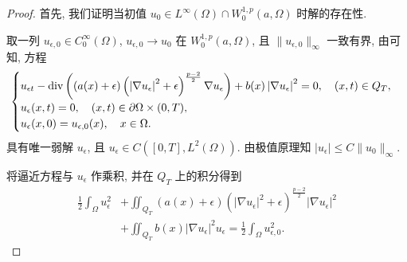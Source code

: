 \documentclass[oneside,longtitle]{LZUthesis}
\numberwithin{equation}{chapter}
\newcommand*\abs[1]{\lvert#1\rvert}
\newcommand*\norm[1]{\lVert#1\rVert}
\DeclareMathOperator{\Div}{div}
\begin{document}
\begin{proof}
	首先, 我们证明当初值 $u_0 \in L^{\infty}(\Omega) \cap W_0^{1, p}(a, \Omega)$ 时解的存在性.

	取一列 $u_{\epsilon,0} \in C_0^\infty(\Omega) $, $u_{\epsilon,0} \to u_0 $ 在 $W_0^{1,p}(a, \Omega) $,
	且 $\norm{u_{\epsilon, 0}}_{\infty}$ 一致有界,
	由\citep{taylorPartialDifferentialEquations2011}可知, 方程
	\begin{equation}\label{eq:approximated_maineq}
		\begin{cases}
			u_{\epsilon t}-\Div\left((a(x)+\epsilon)
			\left(\left|\nabla u_{\epsilon}\right|^{2}+\epsilon\right)^{\frac{p-2}{2}} \nabla u_{\epsilon}\right)
			+b(x)\left|\nabla u_{\epsilon}\right|^{2} = 0, \quad (x, t) \in Q_{T}, \\
			u_{\epsilon}(x, t)  = 0, \quad (x, t) \in \partial \Omega \times(0, T), \notag \\
			u_{\epsilon}(x, 0)  = u_{\epsilon, 0}(x), \quad x \in \Omega. \notag
		\end{cases}
	\end{equation}
	具有唯一弱解 $u_\epsilon$, 且 $u_\epsilon \in C([0, T], L^2(\Omega))$.
	由极值原理知 $\abs{u_{\epsilon}} \leq C\norm{u_0}_{\infty}$.

	将逼近方程与 $u_\epsilon$ 作乘积, 并在 $Q_T$ 上的积分得到
	\begin{equation}\label{eq:1}
		\begin{split}
			\frac{1}{2} \int_{\Omega} u_{\epsilon}^{2}
			&+\iint_{Q_{T}}(a(x)+\epsilon)\left(\left|\nabla u_{\epsilon}\right|^{2}+\epsilon\right)^{\frac{p-2}{2}}\left|\nabla u_{\epsilon}\right|^{2}\\
			&+\iint_{Q_{T}} b(x)\left|\nabla u_{\epsilon}\right|^{2} u_{\epsilon}  =\frac{1}{2} \int_{\Omega} u_{\epsilon, 0}^{2}.
		\end{split}
	\end{equation}


\end{proof}
\end{document}
